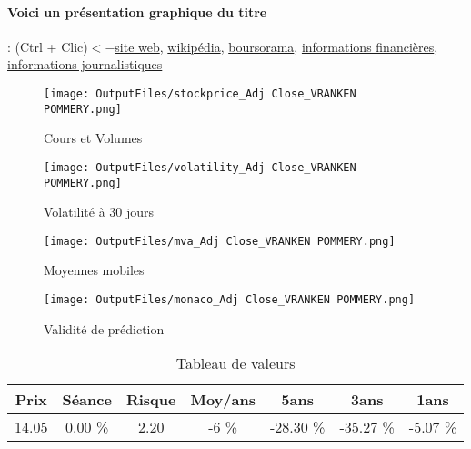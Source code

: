 \documentclass[11pt,a4paper]{report}%
\begin{document}
\paragraph{Voici un présentation graphique du titre} : (Ctrl + Clic)$<-$\href{https://www.vrankenpommery.com/}{site web}, \href{https://fr.wikipedia.org/wiki/Vranken-Pommery_Monopole}{wikipédia}, \href{https://www.boursorama.com/cours/1rPVRAP}{boursorama}, \href{https://www.qwant.com/?q=site:https:%2f%2fwww.easybourse.com%2faction-societe%2fVRANKEN-POMMERY&t=web&client=ext-firefox-hp}{informations financières}, \href{https://bourse.lerevenu.com/cours-de-bourse/fiche-valeur-synthese/VRANKEN-POMMERY/VRAP-FR}{informations journalistiques}
\begin{figure}[!htb]
   \begin{minipage}{0.5\textwidth}
     \centering
     \texttt{[image: OutputFiles/stockprice\_Adj Close\_VRANKEN POMMERY.png]}
     \caption{Cours et Volumes}\label{Fig:price_VRANKEN POMMERY}
   \end{minipage}\hfill
   \begin{minipage}{0.5\textwidth}
     \centering
     \texttt{[image: OutputFiles/volatility\_Adj Close\_VRANKEN POMMERY.png]}
     \caption{Volatilité à 30 jours}\label{Fig:volat_VRANKEN POMMERY}
   \end{minipage}
\end{figure}
\begin{figure}[!htb]
   \begin{minipage}{0.5\textwidth}
     \centering
     \texttt{[image: OutputFiles/mva\_Adj Close\_VRANKEN POMMERY.png]}
     \caption{Moyennes mobiles}\label{Fig:mva_VRANKEN POMMERY}
   \end{minipage}\hfill
   \begin{minipage}{0.5\textwidth}
     \centering
     \texttt{[image: OutputFiles/monaco\_Adj Close\_VRANKEN POMMERY.png]}
     \caption{Validité de prédiction}\label{Fig:prediction_VRANKEN POMMERY}
   \end{minipage}
\end{figure}

\begin{table}[H]
  \centering
    \begin{tabular}{|c|c|c|c|c|c|c|}
    \hline
    Prix & Séance & Risque  & Moy/ans & 5ans & 3ans & 1ans \\
    \hline
    14.05 &    0.00 \%    & 2.20 & -6 \% & -28.30 \% & -35.27 \% & -5.07 \% \\
    \hline
    \end{tabular}%
        \label{tab:table_VRANKEN POMMERY}%
      \caption{Tableau de valeurs}
\end{table}%
\end{document}
